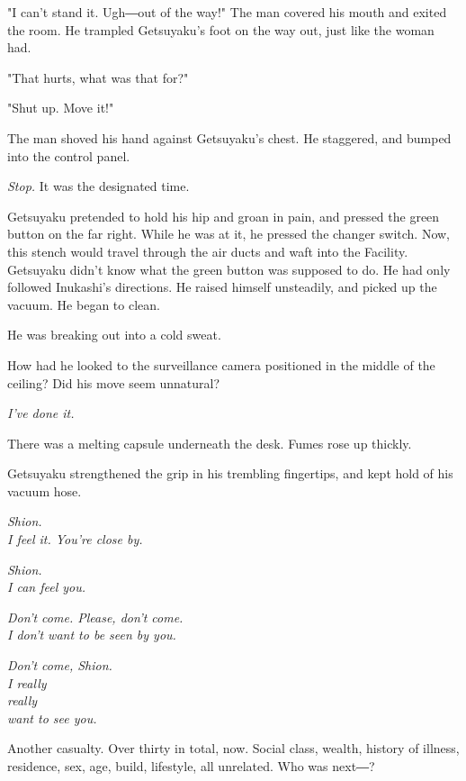 "I can't stand it. Ugh―out of the way!" The man covered his mouth and
exited the room. He trampled Getsuyaku's foot on the way out, just like
the woman had.

"That hurts, what was that for?"

"Shut up. Move it!"

The man shoved his hand against Getsuyaku's chest. He staggered, and
bumped into the control panel.

\emph{Stop.} It was the designated time.

Getsuyaku pretended to hold his hip and groan in pain, and pressed the
green button on the far right. While he was at it, he pressed the
changer switch. Now, this stench would travel through the air ducts and
waft into the Facility. Getsuyaku didn't know what the green button was
supposed to do. He had only followed Inukashi's directions. He raised
himself unsteadily, and picked up the vacuum. He began to clean.

He was breaking out into a cold sweat.

How had he looked to the surveillance camera positioned in the middle of
the ceiling? Did his move seem unnatural?

\emph{I've done it.}

There was a melting capsule underneath the desk. Fumes rose up thickly.

Getsuyaku strengthened the grip in his trembling fingertips, and kept
hold of his vacuum hose.

\myspace

\emph{Shion.\\
	I feel it. You're close by.}

\myspace

\emph{Shion.\\
	I can feel you.}

\myspace

\emph{Don't come. Please, don't come.\\
	I don't want to be seen by you.}

\myspace

\emph{Don't come, Shion.\\
	I really\\
	really\\
	want to see you.}

\myspace

Another casualty. Over thirty in total, now. Social class, wealth,
history of illness, residence, sex, age, build, lifestyle, all
unrelated. Who was next―?

